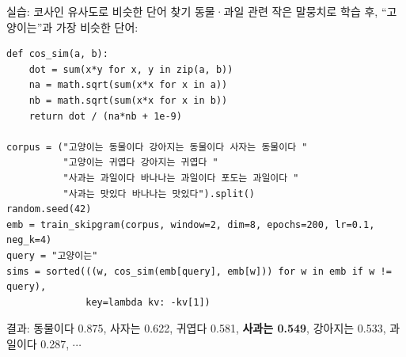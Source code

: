 \begin{frame}[fragile]{실습: 코사인 유사도로 비슷한 단어 찾기}
  동물·과일 관련 작은 말뭉치로 학습 후, ``고양이는''과 가장 비슷한
  단어:
\begin{lstlisting}
def cos_sim(a, b):
    dot = sum(x*y for x, y in zip(a, b))
    na = math.sqrt(sum(x*x for x in a))
    nb = math.sqrt(sum(x*x for x in b))
    return dot / (na*nb + 1e-9)

corpus = ("고양이는 동물이다 강아지는 동물이다 사자는 동물이다 "
          "고양이는 귀엽다 강아지는 귀엽다 "
          "사과는 과일이다 바나나는 과일이다 포도는 과일이다 "
          "사과는 맛있다 바나나는 맛있다").split()
random.seed(42)
emb = train_skipgram(corpus, window=2, dim=8, epochs=200, lr=0.1, neg_k=4)
query = "고양이는"
sims = sorted(((w, cos_sim(emb[query], emb[w])) for w in emb if w != query),
              key=lambda kv: -kv[1])
\end{lstlisting}
  {\footnotesize 결과: 동물이다 0.875, 사자는 0.622, 귀엽다 0.581,
  \textbf{사과는 0.549}, 강아지는 0.533, 과일이다 0.287, $\cdots$}
\end{frame}
